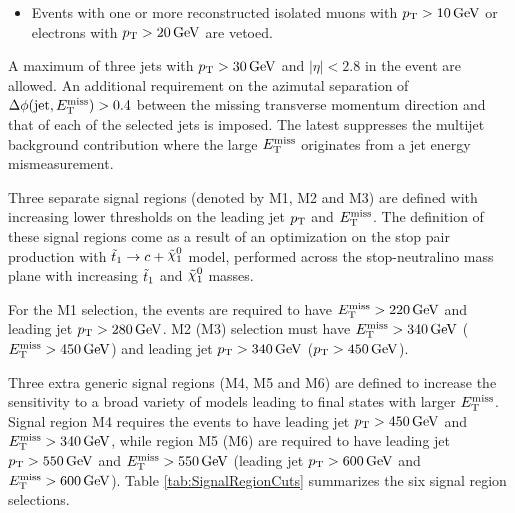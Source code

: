 \begin{itemize}
\item Events with one or more reconstructed isolated muons with $\pt>\unit[10]{GeV}$ or electrons with $\pt>\unit[20]{GeV}$ are vetoed.
\end{itemize}

A maximum of three jets with $\pt>\unit[30]{GeV}$ and $|\eta|<2.8$ in the event are allowed.
An additional requirement on the azimutal separation of $\Delta\phi(\text{jet}, \met) > 0.4$ between the missing transverse momentum direction and that of each of the selected jets is imposed.
The latest suppresses the multijet background contribution where the large $E_{\mathrm{T}}^{\mathrm{miss}}$ originates from a jet energy mismeasurement.

Three separate signal regions (denoted by M1, M2 and M3) are defined with increasing lower thresholds on the leading jet $p_{\mathrm{T}}$ and $E_{\mathrm{T}}^{\mathrm{miss}}$.
The definition of these signal regions come as a result of an optimization on the stop pair production with $\stoptocharm$ model, performed across the stop-neutralino mass plane with increasing $\tilde{t}_1$ and $\ninoone$ masses.

For the M1 selection, the events are required to have $\met>\unit[220]{GeV}$ and leading jet $\pt>\unit[280]{GeV}$. M2 (M3) selection must have $\met>\unit[340]{GeV}$ ($\met>\unit[450]{GeV}$) and leading jet $\pt>\unit[340]{GeV}$ ($\pt>\unit[450]{GeV}$).

Three extra generic signal regions (M4, M5 and M6) are defined to increase the sensitivity to a broad variety of models leading to final states with larger $E_{\mathrm{T}}^{\mathrm{miss}}$. Signal region M4 requires the events to have leading jet $\pt>\unit[450]{GeV}$ and $\met>\unit[340]{GeV}$, while region M5 (M6) are required to have leading jet $\pt>\unit[550]{GeV}$ and $\met>\unit[550]{GeV}$ (leading jet $\pt>\unit[600]{GeV}$ and $\met>\unit[600]{GeV}$).
Table \ref{tab:SignalRegionCuts} summarizes the six signal region selections.


